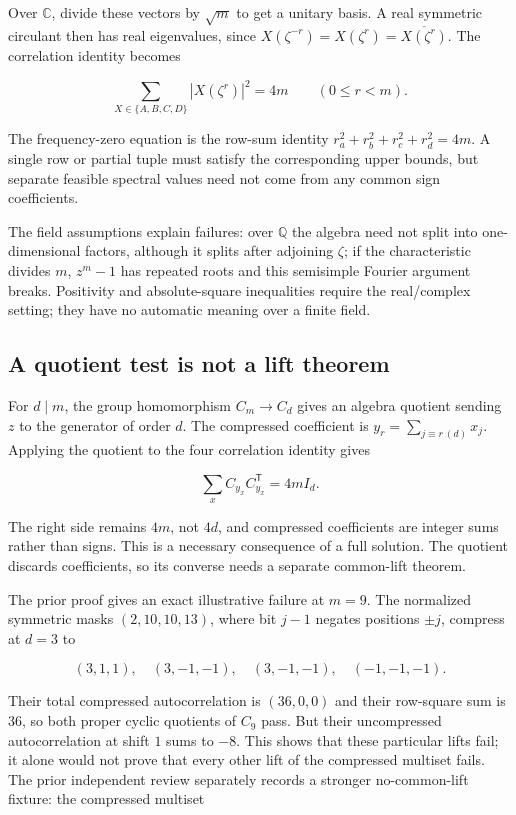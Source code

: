 \documentclass[
  11pt,
]{article}
\begin{document}
Over \(\mathbb C\), divide these vectors by \(\sqrt m\) to get a unitary
basis. A real symmetric circulant then has real eigenvalues, since
\(X(\zeta^{-r})=X(\zeta^r)=\overline{X(\zeta^r)}\). The correlation
identity becomes

\[\sum_{X\in\{A,B,C,D\}}|X(\zeta^r)|^2=4m\qquad(0\le r<m).\]

The frequency-zero equation is the row-sum identity
\(r_a^2+r_b^2+r_c^2+r_d^2=4m\). A single row or partial tuple must
satisfy the corresponding upper bounds, but separate feasible spectral
values need not come from any common sign coefficients.

The field assumptions explain failures: over \(\mathbb Q\) the algebra
need not split into one-dimensional factors, although it splits after
adjoining \(\zeta\); if the characteristic divides \(m\), \(z^m-1\) has
repeated roots and this semisimple Fourier argument breaks. Positivity
and absolute-square inequalities require the real/complex setting; they
have no automatic meaning over a finite field.

\subsection{A quotient test is not a lift
theorem}\label{a-quotient-test-is-not-a-lift-theorem}

For \(d\mid m\), the group homomorphism \(C_m\to C_d\) gives an algebra
quotient sending \(z\) to the generator of order \(d\). The compressed
coefficient is \(y_r=\sum_{j\equiv r\ (d)}x_j\). Applying the quotient
to the four correlation identity gives

\[\sum_x C_{y_x}C_{y_x}^{\mathsf T}=4mI_d.\]

The right side remains \(4m\), not \(4d\), and compressed coefficients
are integer sums rather than signs. This is a necessary consequence of a
full solution. The quotient discards coefficients, so its converse needs
a separate common-lift theorem.

The prior proof gives an exact illustrative failure at \(m=9\). The
normalized symmetric masks \((2,10,10,13)\), where bit \(j-1\) negates
positions \(\pm j\), compress at \(d=3\) to

\[(3,1,1),\quad(3,-1,-1),\quad(3,-1,-1),\quad(-1,-1,-1).\]

Their total compressed autocorrelation is \((36,0,0)\) and their
row-square sum is \(36\), so both proper cyclic quotients of \(C_9\)
pass. But their uncompressed autocorrelation at shift \(1\) sums to
\(-8\). This shows that these particular lifts fail; it alone would not
prove that every other lift of the compressed multiset fails. The prior
independent review separately records a stronger no-common-lift fixture:
the compressed multiset
\end{document}
